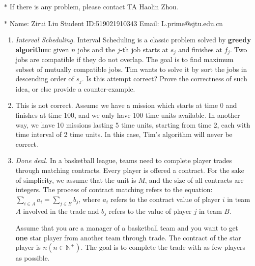 \documentclass[12pt,a4paper]{article}
\makeatletter
\newtheorem*{solution}{Solution}
\theoremstyle{definition}
\renewenvironment{solution}[1][Solution] {\par\pushQED{\qed}\normalfont\topsep6\p@\@plus6\p@\relax\trivlist\item[\hskip\labelsep\bfseries#1\@addpunct{.}]\ignorespaces}{\popQED\endtrivlist\@endpefalse} \makeatother
\makeatother
\begin{document}
\noindent

\noindent{}


\begin{center}
\footnotesize{\color{red}$*$ If there is any problem, please contact TA Haolin Zhou.}\par
\footnotesize{\color{blue}$*$ Name: Zirui Liu  \quad Student ID:519021910343 \quad Email: L.prime@sjtu.edu.cn}
\end{center}

\begin{enumerate}
	\item \textit{Interval Scheduling.} Interval Scheduling is a classic problem solved by \textbf{greedy algorithm}: given $n$ jobs and the $j$-th job starts at $s_j$ and finishes at $f_j$. Two jobs are compatible if they do not overlap. The goal is to find maximum subset of mutually compatible jobs. Tim wants to solve it by sort the jobs in descending order of $s_j$. Is this attempt correct? Prove the correctness of such idea, or else provide a counter-example.
	    \begin{solution}
	        This is not correct. Assume we have a mission which starts at time 0 and finishes at time 100, and we only have 100 time units available. In another way, we have 10 missions lasting 5 time units, starting from time 2, each with time interval of 2 time units. In this case, Tim's algorithm will never be correct. 
	    \end{solution}
	
	\item \textit{Done deal.} In a basketball league, teams need to complete player trades through matching contracts. Every player is offered a contract. For the sake of simplicity, we assume that the unit is $ M $, and the size of all contracts are integers. The process of contract matching refers to the equation: $ \sum_{i\in A} a_{i}=\sum_{j\in B} b_{j} $, where $ a_{i} $ refers to the contract value of player $ i $ in team $A$ involved in the trade and $ b_{j} $ refers to the value of player $ j $ in team $B$. 
	
	Assume that you are a manager of a basketball team and you want to get \textbf{one} star player from another team through trade. The contract of the star player is $ n (n\in \mathbb{N}^+) $. The goal is to complete the trade with as few players as possible. 
	

\end{enumerate}
\end{document}
